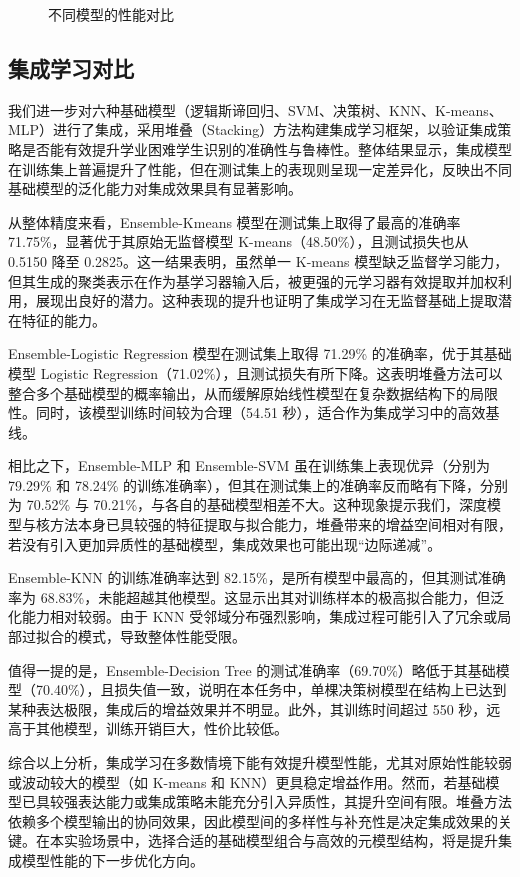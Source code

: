 \documentclass[a4paper, utf8]{ctexart}
\begin{document}
\begin{figure}
\begin{minipage}{.32\textwidth}
			\caption{不同模型的性能对比}
		\end{minipage}
	\end{figure}
	
	\subsection{集成学习对比}
	
	我们进一步对六种基础模型（逻辑斯谛回归、SVM、决策树、KNN、K-means、MLP）进行了集成，采用堆叠（Stacking）方法构建集成学习框架，以验证集成策略是否能有效提升学业困难学生识别的准确性与鲁棒性。整体结果显示，集成模型在训练集上普遍提升了性能，但在测试集上的表现则呈现一定差异化，反映出不同基础模型的泛化能力对集成效果具有显著影响。
	
	从整体精度来看，Ensemble-Kmeans 模型在测试集上取得了最高的准确率 71.75\%，显著优于其原始无监督模型 K-means（48.50\%），且测试损失也从 0.5150 降至 0.2825。这一结果表明，虽然单一 K-means 模型缺乏监督学习能力，但其生成的聚类表示在作为基学习器输入后，被更强的元学习器有效提取并加权利用，展现出良好的潜力。这种表现的提升也证明了集成学习在无监督基础上提取潜在特征的能力。
	
	Ensemble-Logistic Regression 模型在测试集上取得 71.29\% 的准确率，优于其基础模型 Logistic Regression（71.02\%），且测试损失有所下降。这表明堆叠方法可以整合多个基础模型的概率输出，从而缓解原始线性模型在复杂数据结构下的局限性。同时，该模型训练时间较为合理（54.51 秒），适合作为集成学习中的高效基线。
	
	相比之下，Ensemble-MLP 和 Ensemble-SVM 虽在训练集上表现优异（分别为 79.29\% 和 78.24\% 的训练准确率），但其在测试集上的准确率反而略有下降，分别为 70.52\% 与 70.21\%，与各自的基础模型相差不大。这种现象提示我们，深度模型与核方法本身已具较强的特征提取与拟合能力，堆叠带来的增益空间相对有限，若没有引入更加异质性的基础模型，集成效果也可能出现“边际递减”。
	
	Ensemble-KNN 的训练准确率达到 82.15\%，是所有模型中最高的，但其测试准确率为 68.83\%，未能超越其他模型。这显示出其对训练样本的极高拟合能力，但泛化能力相对较弱。由于 KNN 受邻域分布强烈影响，集成过程可能引入了冗余或局部过拟合的模式，导致整体性能受限。
	
	值得一提的是，Ensemble-Decision Tree 的测试准确率（69.70\%）略低于其基础模型（70.40\%），且损失值一致，说明在本任务中，单棵决策树模型在结构上已达到某种表达极限，集成后的增益效果并不明显。此外，其训练时间超过 550 秒，远高于其他模型，训练开销巨大，性价比较低。
	
	综合以上分析，集成学习在多数情境下能有效提升模型性能，尤其对原始性能较弱或波动较大的模型（如 K-means 和 KNN）更具稳定增益作用。然而，若基础模型已具较强表达能力或集成策略未能充分引入异质性，其提升空间有限。堆叠方法依赖多个模型输出的协同效果，因此模型间的多样性与补充性是决定集成效果的关键。在本实验场景中，选择合适的基础模型组合与高效的元模型结构，将是提升集成模型性能的下一步优化方向。
	
\end{document}
